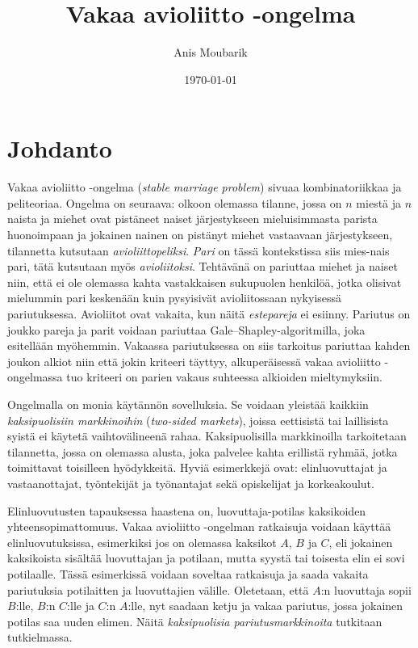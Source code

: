 \documentclass[finnish]{tktltiki2}
\title{Vakaa avioliitto -ongelma}
\author{Anis Moubarik}
\date{\today}
\theoremstyle{definition}
\theoremstyle{remark}
\begin{document}

\maketitle        %
\makeabstract
\tableofcontents  %
\newpage          %



\section{Johdanto}
Vakaa avioliitto -ongelma (\emph{stable marriage problem}) sivuaa kombinatoriikkaa ja peliteoriaa. Ongelma on seuraava: olkoon olemassa tilanne, jossa on $n$ miestä ja $n$ naista ja miehet ovat pistäneet naiset järjestykseen mieluisimmasta parista huonoimpaan ja jokainen nainen on pistänyt miehet vastaavaan järjestykseen, tilannetta kutsutaan \emph{avioliittopeliksi}. \emph{Pari} on tässä kontekstissa siis mies-nais pari, tätä kutsutaan myös \emph{avioliitoksi}. Tehtävänä on pariuttaa miehet ja naiset niin, että ei ole olemassa kahta vastakkaisen sukupuolen henkilöä, jotka olisivat mielummin pari keskenään kuin pysyisivät avioliitossaan nykyisessä pariutuksessa. Avioliitot ovat vakaita, kun näitä \emph{estepareja} ei esiinny. Pariutus on joukko pareja ja parit voidaan pariuttaa Gale--Shapley-algoritmilla, joka esitellään myöhemmin. Vakaassa pariutuksessa on siis tarkoitus pariuttaa kahden joukon alkiot niin että jokin kriteeri täyttyy, alkuperäisessä vakaa avioliitto -ongelmassa tuo kriteeri on parien vakaus suhteessa alkioiden mieltymyksiin.

Ongelmalla on monia käytännön sovelluksia. Se voidaan yleistää kaikkiin \emph{kaksipuolisiin markkinoihin} (\emph{two-sided markets}), joissa eettisistä tai laillisista syistä ei käytetä vaihtovälineenä rahaa. Kaksipuolisilla markkinoilla tarkoitetaan tilannetta, jossa on olemassa alusta, joka palvelee kahta erillistä ryhmää, jotka toimittavat toisilleen hyödykkeitä. Hyviä esimerkkejä ovat: elinluovuttajat ja vastaanottajat, työntekijät ja työnantajat sekä opiskelijat ja korkeakoulut.

Elinluovutusten tapauksessa haastena on, luovuttaja-potilas kaksikoiden yhteensopimattomuus. Vakaa avioliitto -ongelman ratkaisuja voidaan käyttää elinluovutuksissa, esimerkiksi jos on olemassa kaksikot $A$, $B$ ja $C$, eli jokainen kaksikoista sisältää luovuttajan ja potilaan, mutta syystä tai toisesta elin ei sovi potilaalle. Tässä esimerkissä voidaan soveltaa ratkaisuja ja saada vakaita pariutuksia potilaitten ja luovuttajien välille. Oletetaan, että $A$:n luovuttaja sopii $B$:lle, $B$:n $C$:lle ja $C$:n $A$:lle, nyt saadaan ketju ja vakaa pariutus, jossa jokainen potilas saa uuden elimen. Näitä \emph{kaksipuolisia pariutusmarkkinoita} tutkitaan tutkielmassa.
\end{document}

